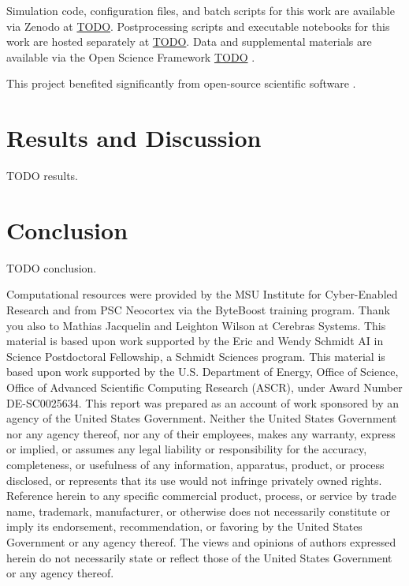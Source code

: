 Simulation code, configuration files, and batch scripts for this work are available via Zenodo at \url{TODO}.
Postprocessing scripts and executable notebooks for this work are hosted separately at \url{TODO}.
Data and supplemental materials are available via the Open Science Framework \url{TODO} \cite{foster2017open}.

This project benefited significantly from open-source scientific software \cite{2020SciPy-NMeth,harris2020array,reback2020pandas,mckinney-proc-scipy-2010,waskom2021seaborn,hunter2007matplotlib,moreno2023teeplot}.

\section{Results and Discussion} \label{sec:results}

TODO results.

\section{Conclusion} \label{sec:conclusion}

TODO conclusion.

\begin{acknowledgement}
Computational resources were provided by the MSU Institute for Cyber-Enabled Research and from PSC Neocortex via the ByteBoost training program.
Thank you also to Mathias Jacquelin and Leighton Wilson at Cerebras Systems.
This material is based upon work supported by the Eric and Wendy Schmidt AI in Science Postdoctoral Fellowship, a Schmidt Sciences program.
This material is based upon work supported by the U.S. Department of Energy, Office of Science, Office of Advanced Scientific Computing Research (ASCR), under Award Number DE-SC0025634.
This report was prepared as an account of work sponsored by an agency of the United States Government.
Neither the United States Government nor any agency thereof, nor any of their employees, makes any warranty, express or implied, or assumes any legal liability or responsibility for the accuracy, completeness, or usefulness of any information, apparatus, product, or process disclosed, or represents that its use would not infringe privately owned rights.
Reference herein to any specific commercial product, process, or service by trade name, trademark, manufacturer, or otherwise does not necessarily constitute or imply its endorsement, recommendation, or favoring by the United States Government or any agency thereof.
The views and opinions of authors expressed herein do not necessarily state or reflect those of the United States Government or any agency thereof.
\end{acknowledgement}

